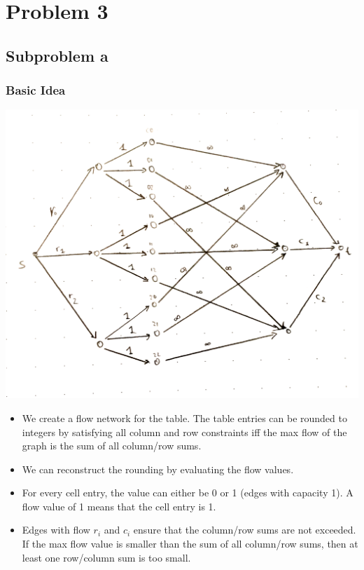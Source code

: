 \documentclass[12pt]{article}
\begin{document}
\section*{Problem 3}
\subsection*{Subproblem a}
\subsubsection*{Basic Idea}
\includegraphics[width=\textwidth]{3_a.pdf}
\begin{itemize}
	\item We create a flow network for the table. The table entries can be rounded to integers by satisfying all column and row constraints iff the max flow of the graph is the sum of all column/row sums.
	\item We can reconstruct the rounding by evaluating the flow values.
	\item For every cell entry, the value can either be 0 or 1 (edges with capacity 1). A flow value of 1 means that the cell entry is 1.
	\item Edges with flow $r_i$ and $c_i$ ensure that the column/row sums are not exceeded. If the max flow value is smaller than the sum of all column/row sums, then at least one row/column sum is too small.
\end{itemize}
\end{document}
